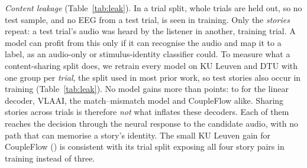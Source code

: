 \documentclass[twoside]{article}
\begin{document}
\emph{Content leakage} (Table~\ref{tab:leak}). In a trial split, whole trials are held
out, so no test sample, and no EEG from a test trial, is seen in training. Only the
\emph{stories} repeat: a test trial's audio was heard by the listener in another, training
trial. A model can profit from this only if it can recognise the audio and map it to a
label, as an audio-only or stimulus-identity classifier could. To measure what a content-sharing split does, we retrain every
model on KU Leuven and DTU with one group per \emph{trial}, the split used in most prior
work, so test stories also occur in training (Table~\ref{tab:leak}). No model gains
more than \leakMax{} points: \leakMin{} to \leakMax{} for the linear decoder, VLAAI, the match--mismatch
model and CoupleFlow alike. Sharing stories across trials is therefore \emph{not} what
inflates these decoders. Each of them reaches the decision through the neural response
to the candidate audio, with no path that can memorise a story's identity. The small KU Leuven gain for CoupleFlow (\leakMax) is consistent
with its trial split exposing all four story pairs in training instead of three.
\end{document}
